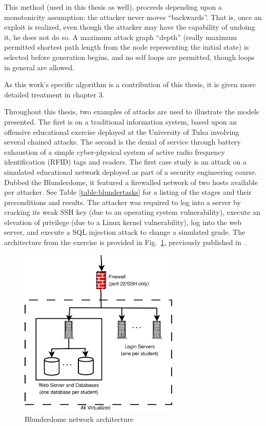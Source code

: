 This method (used in this thesis as well), proceeds
depending upon a monotonicity assumption: the attacker never moves ``backwards''.
That is, once an exploit is realized, even though the attacker may have the capability
of undoing it, he does not do so. A maximum attack graph ``depth'' (really 
maximum permitted shortest path length from the
node representing the initial state) is selected before generation begins, and
no self loops are permitted, though loops in general are allowed.

As this work's specific algorithm is a contribution of this thesis, it is given
more detailed treatment in chapter 3.

Throughout this thesis, two examples of attacks are used to illustrate the models presented.
The first is on a traditional information system, based upon an offensive educational exercise
deployed at the University of Tulsa involving several chained attacks. The second is the 
denial of service through battery exhaustion of a simple
cyber-physical system of active radio frequency identification (RFID) tags and readers.
\label{sec:blunderdome}
The first case study is an attack on a simulated educational network deployed as part of a
security engineering course. Dubbed the Blunderdome, it featured a firewalled network of
two hosts available per attacker. See Table \ref{table:blundertasks} for a listing of the stages and
their preconditions and results. The attacker was required to log into a server by cracking
its weak SSH key (due to an operating system vulnerability), execute an elevation of privilege (due
to a Linux kernel vulnerability), log into the web server, and execute a SQL injection attack to
change a simulated grade. The architecture from the exercise is provided in 
Fig.~\ref{fig:blunderarch}, previously published in~\cite{louthan2010blunderdome}.

\begin{figure}
\centering
\includegraphics[width=3in]{blunderarch}
\caption{Blunderdome network architecture}
\label{fig:blunderarch}
\end{figure}

